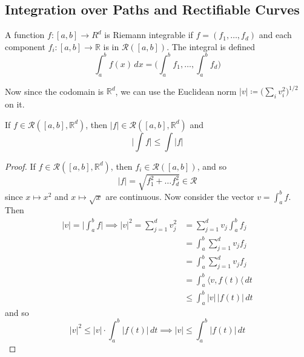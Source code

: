 \subsection{Integration over Paths and Rectifiable Curves}

  \begin{definition}
    A function $f: [a, b] \to R^d$ is Riemann integrable if $f = (f_1, \ldots, f_d)$ and each component $f_i: [a, b] \to \mathbb{R}$ is in $\mathcal{R}([a, b])$. The integral is defined 
    \begin{equation}
      \int_a^b f(x) \,dx = \bigg(\int_a^b f_1, \ldots, \int_a^b f_d \bigg)
    \end{equation}
  \end{definition}

  Now since the codomain is $\mathbb{R}^d$, we can use the Euclidean norm $|v| \coloneqq \big( \sum_i v_i^2 \big)^{1/2}$ on it. 

  \begin{theorem}
    If $f \in \mathcal{R}([a, b], \mathbb{R}^d)$, then $|f| \in \mathcal{R}([a, b], \mathbb{R}^d)$ and 
    \begin{equation}
      \bigg| \int f \bigg| \leq \int |f|
    \end{equation}
  \end{theorem}
  \begin{proof}
    If $f \in \mathcal{R}([a, b], \mathbb{R}^d)$, then $f_i \in \mathcal{R}([a, b])$, and so 
    \begin{equation}
      |f| = \sqrt{f_1^2 + \ldots f_d^2} \in \mathcal{R}
    \end{equation}
    since $x \mapsto x^2$ and $x \mapsto \sqrt{x}$ are continuous. Now consider the vector $v = \int_a^b f$. Then 
    \begin{align}
      |v| = \bigg| \int_a^b f \bigg| \implies |v|^2 = \sum_{j=1}^d v_j^2 & = \sum_{j=1}^d v_j \int_a^b f_j \\ 
                                                                         & = \int_a^b \sum_{j=1}^d v_j f_j \\ 
                                                                         & = \int_a^b \sum_{j=1}^d v_j f_j \\
                                                                         & = \int_a^b \langle v, f(t) \langle \,dt \\ 
                                                                         & \leq  \int_a^b |v|\, |f(t)| \,dt
    \end{align}
    and so 
    \begin{equation}
      |v|^2 \leq |v| \cdot \int_a^b |f(t)| \,dt \implies |v| \leq \int_a^b |f(t)| \,dt 
    \end{equation}
  \end{proof}

